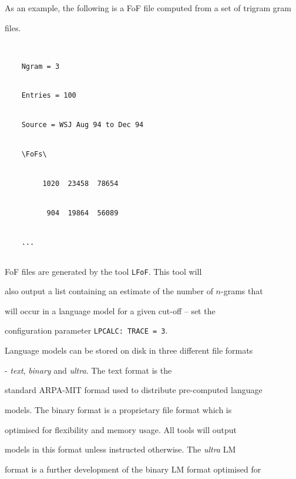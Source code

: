 As an example, the following is a FoF file computed from a set of trigram gram


files.


\begin{verbatim}


    Ngram = 3


    Entries = 100


    Source = WSJ Aug 94 to Dec 94


    \FoFs\


         1020  23458  78654


          904  19864  56089


    ...


\end{verbatim}





FoF files are generated by the tool \texttt{LFoF}.  This tool will


also output a list containing an estimate of the number of $n$-grams that


will occur in a language model for a given cut-off -- set the


configuration parameter {\tt LPCALC: TRACE = 3}.




















Language models can be stored on disk in three different file formats


- {\em text}, {\em binary} and {\em ultra}. The text format is the


standard ARPA-MIT formad used to distribute pre-computed language


models.  The binary format is a proprietary file format which is


optimised for flexibility and memory usage.  All tools will output


models in this format unless instructed otherwise.  The {\em ultra} LM


format is a further development of the binary LM format optimised for


